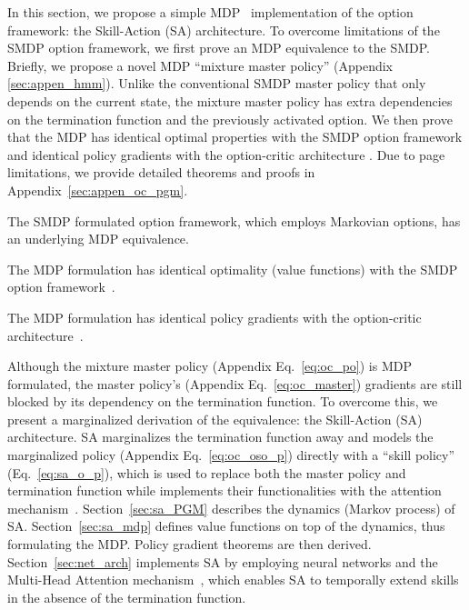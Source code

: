 In this section, we propose a simple
MDP~\cite{puterman2014markov} implementation of the option
framework: the Skill-Action (SA) architecture. To overcome
limitations of the SMDP option framework, we first prove an MDP
equivalence to the SMDP. Briefly, we propose a novel MDP
``mixture master policy'' (Appendix \ref{sec:appen_hmm}). Unlike
the conventional SMDP master policy that only depends on the
current state, the mixture master policy has extra dependencies
on the termination function and the previously activated option.
We then prove that the MDP has identical optimal properties with
the SMDP option framework \cite{sutton1999between} and identical
policy gradients with the option-critic architecture
\cite{bacon2017option}. Due to page limitations, we provide
detailed theorems and proofs in Appendix~\ref{sec:appen_oc_pgm}.

\begin{thm}
  \label{theo:smdp_mdp}
  The SMDP formulated option framework, which employs Markovian
  options, has an underlying MDP equivalence.
\end{thm}
\begin{prop}
  \label{theo:smdp_mdp}
  The MDP formulation has identical optimality (value functions)
  with the SMDP option framework~\cite{sutton1999between}.
\end{prop}
\begin{prop}
  \label{theo:smdp_mdp}
  The MDP formulation has identical policy gradients with the
  option-critic architecture~\cite{bacon2017option}.
\end{prop}

Although the mixture master policy (Appendix Eq.~\ref{eq:oc_po})
is MDP formulated, the master policy's (Appendix
Eq.~\ref{eq:oc_master}) gradients are still blocked by its
dependency on the termination function. To overcome this, we
present a marginalized derivation of the equivalence: the
Skill-Action (SA) architecture. SA marginalizes the termination
function away and models the marginalized policy (Appendix
Eq.~\ref{eq:oc_oso_p}) directly with a ``skill policy''
(Eq.~\ref{eq:sa_o_p}), which is used to replace both the master
policy and termination function while implements their
functionalities with the attention
mechanism~\cite{vaswani2017attention}. Section~\ref{sec:sa_PGM}
describes the dynamics (Markov process) of SA.
Section~\ref{sec:sa_mdp} defines value functions on top of the
dynamics, thus formulating the MDP. Policy gradient theorems are
then derived. Section~\ref{sec:net_arch} implements SA by
employing neural networks and the Multi-Head Attention
mechanism~\cite{vaswani2017attention}, which enables SA to
temporally extend skills in the absence of the termination
function.


